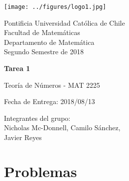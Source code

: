 


\begin{minipage}{2.5cm}
	\texttt{[image: ../figures/logo1.jpg]}
\end{minipage}
\begin{minipage}{13cm}
	\begin{flushleft}
		\raggedright
		{
			\noindent
			{\sc Pontificia Universidad Católica de Chile\\
				Facultad de Matemáticas\\
				Departamento de Matemática} \smallskip \\
			Segundo Semestre de 2018\\
		}
	\end{flushleft}
\end{minipage}

\vspace{2ex}
{\Large \centerline{\bf Tarea 1}}
{\large \centerline{Teoría de Números - MAT 2225}}
\centerline{Fecha de Entrega: 2018/08/13}

\begin{flushright}
	Integrantes del grupo:\\
	Nicholas Mc-Donnell, Camilo Sánchez,\\
	Javier Reyes
\end{flushright}

\section{Problemas}

